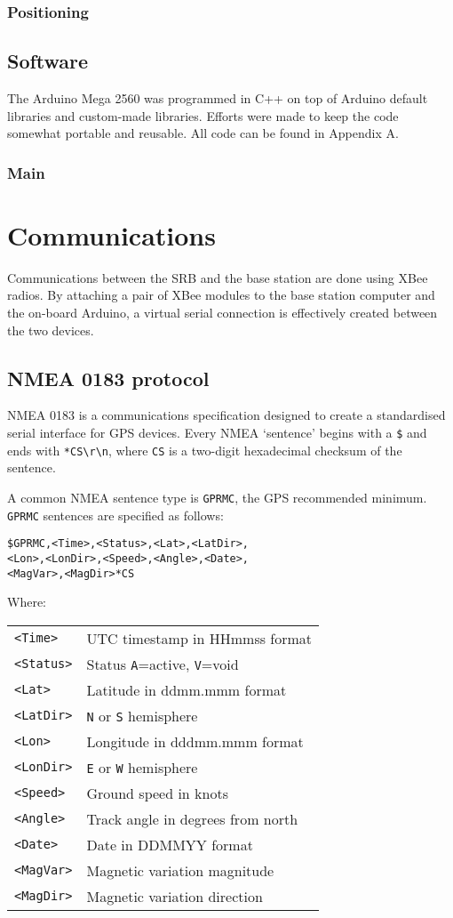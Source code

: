 \documentclass[a4paper]{IEEEtran}
\newenvironment{nmeaspec}[1]
{
\newcommand{\field}[2]{\texttt{##1} & ##2 \\}
\vspace{0.2cm}
\noindent\texttt{#1}
\vspace{0.2cm}

\noindent Where: \vspace{0.1cm}\\  \noindent
\vspace{0.2cm}
\begin{tabular}{ll}
}
{
\end{tabular}
}
\begin{document}
\subsubsection{Positioning}

\subsection{Software}
The Arduino Mega 2560 was programmed in C++ on top of Arduino default libraries and custom-made libraries. Efforts were made to keep the code somewhat portable and reusable. All code can be found in Appendix A.

\subsubsection{Main}

\section{Communications}
Communications between the SRB and the base station are done using XBee radios. By attaching a pair of XBee modules to the base station computer and the on-board Arduino, a virtual serial connection is effectively created between the two devices.

\subsection{NMEA 0183 protocol}
NMEA 0183 is a communications specification designed to create a standardised serial interface for GPS devices. Every NMEA `sentence' begins with a \texttt{\$} and ends with \texttt{*CS\textbackslash r\textbackslash n}, where \texttt{CS} is a two-digit hexadecimal checksum of the sentence.

A common NMEA sentence type is \texttt{GPRMC}, the GPS recommended minimum. \texttt{GPRMC} sentences are specified as follows: \cite{gpsinfo}

\begin{nmeaspec}{\$GPRMC,<Time>,<Status>,<Lat>,<LatDir>,\\<Lon>,<LonDir>,<Speed>,<Angle>,<Date>,\\<MagVar>,<MagDir>*CS}
\field{<Time>}{UTC timestamp in HHmmss format}
\field{<Status>}{Status \texttt{A}=active, \texttt{V}=void}
\field{<Lat>}{Latitude in ddmm.mmm format}
\field{<LatDir>}{\texttt{N} or \texttt{S} hemisphere}
\field{<Lon>}{Longitude in dddmm.mmm format}
\field{<LonDir>}{\texttt{E} or \texttt{W} hemisphere}
\field{<Speed>}{Ground speed in knots}
\field{<Angle>}{Track angle in degrees from north}
\field{<Date>}{Date in DDMMYY format}
\field{<MagVar>}{Magnetic variation magnitude}
\field{<MagDir>}{Magnetic variation direction}
\end{nmeaspec}
\end{document}
